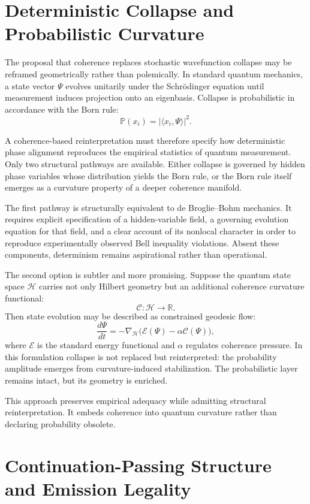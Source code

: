 \documentclass[12pt]{article}
\begin{document}
\section{Deterministic Collapse and Probabilistic Curvature}

The proposal that coherence replaces stochastic wavefunction collapse may be reframed geometrically rather than polemically. In standard quantum mechanics, a state vector $\Psi$ evolves unitarily under the Schrödinger equation until measurement induces projection onto an eigenbasis. Collapse is probabilistic in accordance with the Born rule:
\[
  \mathbb{P}(x_i) = |\langle x_i, \Psi \rangle|^2.
\]

A coherence-based reinterpretation must therefore specify how deterministic phase alignment reproduces the empirical statistics of quantum measurement. Only two structural pathways are available. Either collapse is governed by hidden phase variables whose distribution yields the Born rule, or the Born rule itself emerges as a curvature property of a deeper coherence manifold.

The first pathway is structurally equivalent to de Broglie–Bohm mechanics. It requires explicit specification of a hidden-variable field, a governing evolution equation for that field, and a clear account of its nonlocal character in order to reproduce experimentally observed Bell inequality violations. Absent these components, determinism remains aspirational rather than operational.

The second option is subtler and more promising. Suppose the quantum state space $\mathcal{H}$ carries not only Hilbert geometry but an additional coherence curvature functional:
\[
  \mathcal{C} : \mathcal{H} \to \mathbb{R}.
\]
Then state evolution may be described as constrained geodesic flow:
\[
  \frac{d\Psi}{dt} = -\nabla_{\mathcal{H}} \big( \mathcal{E}(\Psi) - \alpha \mathcal{C}(\Psi) \big),
\]
where $\mathcal{E}$ is the standard energy functional and $\alpha$ regulates coherence pressure. In this formulation collapse is not replaced but reinterpreted: the probability amplitude emerges from curvature-induced stabilization. The probabilistic layer remains intact, but its geometry is enriched.

This approach preserves empirical adequacy while admitting structural reinterpretation. It embeds coherence into quantum curvature rather than declaring probability obsolete.

\section{Continuation-Passing Structure and Emission Legality}
\end{document}
